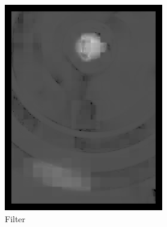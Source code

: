 \begin{figure}
\begin{subfigure}{0.25\textwidth}
\includegraphics[width=\textwidth]{img/motan_2}
\caption{Filter}
\label{fig:motred}
\end{subfigure}%
\begin{subfigure}{0.25\textwidth}

\end{subfigure}
\end{figure}
